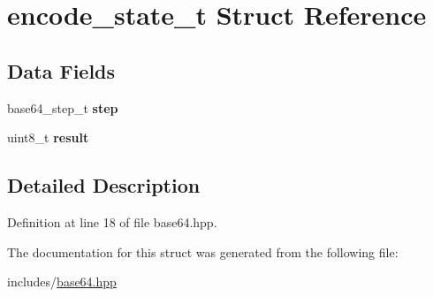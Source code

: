 \hypertarget{structencode__state__t}{}\section{encode\+\_\+state\+\_\+t Struct Reference}
\label{structencode__state__t}
\subsection*{Data Fields}
\begin{DoxyCompactItemize}
\item 
\hypertarget{structencode__state__t_abea8293d3652fd60a3cc135697270ee8}{}base64\+\_\+step\+\_\+t {\bfseries step}\label{structencode__state__t_abea8293d3652fd60a3cc135697270ee8}

\item 
\hypertarget{structencode__state__t_a4bbf81ad5475b8d9e9faa36aecaaee52}{}uint8\+\_\+t {\bfseries result}\label{structencode__state__t_a4bbf81ad5475b8d9e9faa36aecaaee52}

\end{DoxyCompactItemize}


\subsection{Detailed Description}


Definition at line 18 of file base64.\+hpp.



The documentation for this struct was generated from the following file\+:\begin{DoxyCompactItemize}
\item 
includes/\hyperlink{base64_8hpp}{base64.\+hpp}\end{DoxyCompactItemize}
